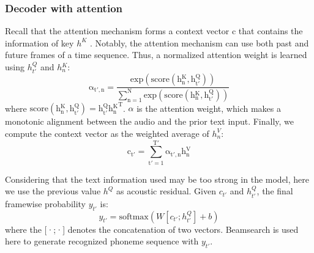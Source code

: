 \documentclass[a4paper]{article}
\begin{document}
\subsubsection{Decoder with attention}

Recall that the attention mechanism forms a context vector c that 
contains the information of key $h^K$ . Notably, the attention mechanism can use both past and future frames of a time sequence. Thus, a normalized attention weight is learned using $h{^Q_{t'}} $ and $  h{^K_n}$:
\begin{equation}
   \mathrm { \alpha{_{t',n}} = \frac { exp(score(h{^K_n},h{^Q_{t'}}))} {\sum\nolimits_{n=1}^N exp(score(h{^K_n},h{^Q_{t'}})) } } \label{eq:alpha}
\end{equation}
where $\mathrm { score(h{^K_n},h{^Q_{t'}}) = {h{^Q_{t'}}}h{^K_n}^T }$. $\alpha$ is the attention weight, which makes a monotonic alignment between the audio and the prior text input. Finally, we compute the context vector as the weighted average of $h^V_n$: 
\begin{equation}
   \mathrm {  c_{t'} = { \sum_{t'=1}^{T'} \alpha{_{{t'},n}}h{^V_n} } } \label{eq:cvector}
\end{equation}

Considering that the text information used may be too strong in the model, here we use the previous value $h^Q$ as acoustic residual. Given $c_{t'}$ and $h^Q_{t'}$, the final framewise probability $y_{t'}$ is:
\begin{equation}
   y_{t'} = \mathrm{softmax}( W[c_{t'};h^Q_{t'}] + b )
\end{equation}
where the [·;·] denotes the concatenation of two vectors. Beamsearch is used here to generate recognized phoneme sequence with $y_{t'}$.
\end{document}
